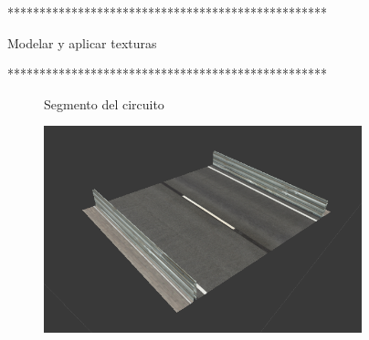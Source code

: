 \documentclass[notes,slidesec,a4]{seminar}
\begin{document}
\begin{hslide}
**************************************************

Modelar y aplicar texturas

**************************************************
\end{hslide}

\begin{hslide}
	\begin{center}
		\begin{figure}
			\begin{center}
				Segmento del circuito
			\end{center}
			\includegraphics[width=0.82\textwidth]{MonacoSegmento.png}
		\end{figure}
	\end{center}
\end{hslide}
\end{document}
